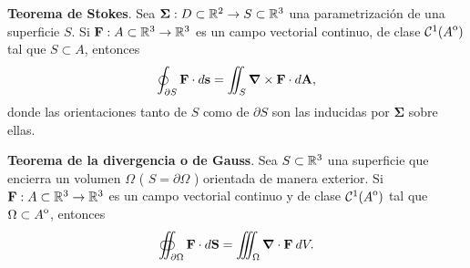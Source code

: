 \begin{theorem}
\textbf{Teorema de Stokes}. Sea $\boldsymbol{\Sigma}:D\subset\mathbb{R}^2 \to S\subset\mathbb{R}^3$    una parametrizaci\'on de una superficie $S$.   Si $\mathbf{F}:  A\subset \mathbb{R}^3\to \mathbb{R}^3$ es un campo vectorial continuo, de clase  $\mathcal{C}^1({\kern0ptA}^{\mathrm{o}})$ tal que  $S \subset A$, entonces
\[
    \oint_{\partial S}\mathbf{F}\cdot d\mathbf{s}=\iint_S\grad\times\mathbf{F}\cdot d\mathbf{A}, 
\]  donde las orientaciones tanto de  $S$ como de $\partial S$ son las inducidas por $\boldsymbol{\Sigma}$ sobre ellas.

\end{theorem}

\begin{theorem}
\textbf{Teorema de la divergencia o de Gauss}. Sea $S\subset\mathbb{R}^3$ una superficie que encierra un volumen $\Omega$ ( $S=\partial \Omega$ ) orientada de manera exterior.  Si $\mathbf{F}:A \subset \mathbb{R}^3 \to\mathbb{R}^3$ es  un campo vectorial continuo y de clase $\mathcal{C}^1({\kern0ptA}^{\mathrm{o}})$ tal que $\Omega \subset {\kern0ptA}^{\mathrm{o}}$, entonces
\[
    \oiint_{\partial \Omega}\mathbf{F}\cdot d\mathbf{S}=\iiint_{\Omega}\grad\cdot\mathbf{F}\:dV.
\]
\end{theorem}